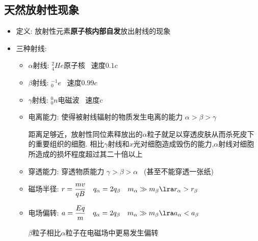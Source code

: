 \documentclass{article}
\begin{document}
\subsection{天然放射性现象}
\begin{itemize}
    \item 定义: 放射性元素\textbf{原子核内部自发}放出射线的现象
    \item 三种射线:
          \begin{itemize}
              \item[] $\alpha$射线: $^{2}_{4}He$原子核 \, 速度$0.1c$
              \item[] $\beta$射线: $^{-1}_{0}e$ \, 速度$0.99c$
              \item[] $\gamma$射线: $^{0}_{0}n$电磁波 \, 速度$c$
              \item[] 电离能力: 使得被射线辐射的物质发生电离的能力 $\alpha > \beta > \gamma$

                  \vspace{-1em}
                  \hspace{-0.9em}\begin{adjustbox}{minipage=0.91\linewidth, bgcolor=gray!20, padding=1em}
                      \small
                      距离足够近，放射性同位素释放出的$\alpha$粒子就足以穿透皮肤从而杀死皮下的重要组织的细胞.
                      相比$\gamma$射线和$x$光对细胞造成毁伤的能力,$\alpha$射线对细胞所造成的损坏程度超过其二十倍以上
                  \end{adjustbox}
                  \vspace{-1em}

              \item[] 穿透能力: 穿透物质能力 $\gamma > \beta > \alpha$ \, (甚至不能穿透一张纸)
              \item[] 磁场半径: $ r = \dfrac{mv}{qB} \quad q_{\alpha} = 2 q_{\beta}
                      \quad m_{\alpha} \gg m_{\beta} \lra r_{\alpha} > r_{\beta} $
              \item[] 电场偏转: $ a = \dfrac{Eq}{m} \quad q_{\alpha} = 2 q_{\beta}
                      \quad m_{\alpha} \gg m_{\beta} \lra a_{\alpha} < a_{\beta} $

                  \vspace{-1em}
                  \hspace{-0.9em}\begin{adjustbox}{minipage=0.4\linewidth, bgcolor=gray!20, padding=1em}
                      \small
                      $\beta$粒子相比$\alpha$粒子在电磁场中更易发生偏转
                  \end{adjustbox}
                  \vspace{-1em}
          \end{itemize}
\end{itemize}
\end{document}
